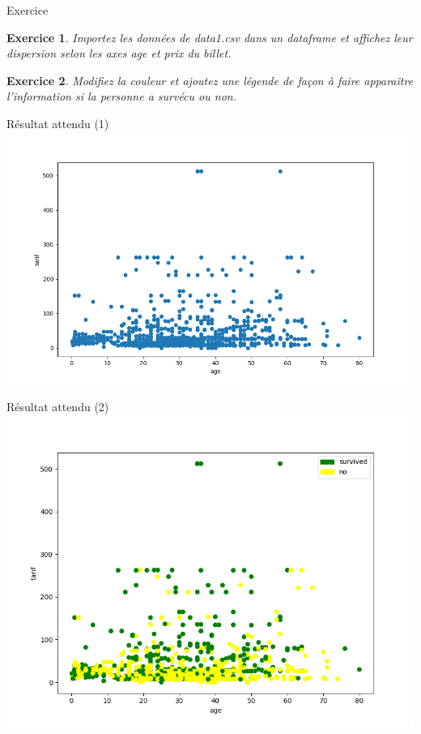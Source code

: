 \documentclass[11pt]{beamer}
\newtheorem{exercice}{Exercice}
\begin{document}
\begin{frame}{Exercice}
\begin{exercice}
Importez les données de data1.csv dans un dataframe et affichez leur dispersion selon les axes age et prix du billet.
\end{exercice}
\begin{exercice}
Modifiez la couleur et ajoutez une légende de façon à faire apparaître l'information si la personne a survécu ou non.
\end{exercice}
\end{frame}

\begin{frame}{Résultat attendu (1)}
\includegraphics[scale=0.45]{ex203bis}
\end{frame}

\begin{frame}{Résultat attendu (2)}
\includegraphics[scale=0.45]{ex204}
\end{frame}
\end{document}
